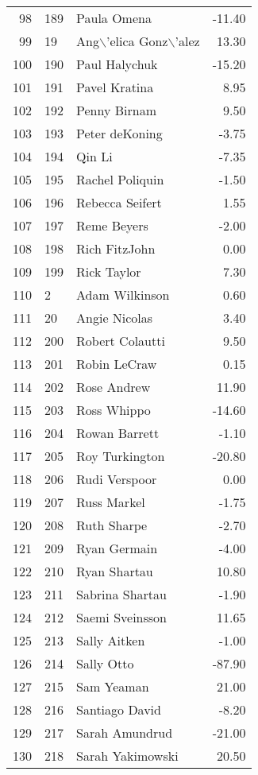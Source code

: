 \begin{table}[ht]
\begin{tabular}{rllr}
  98 & 189 & Paula Omena & -11.40 \\ 
  99 & 19 & Ang$\backslash$'elica Gonz$\backslash$'alez & 13.30 \\ 
  100 & 190 & Paul Halychuk & -15.20 \\ 
  101 & 191 & Pavel Kratina & 8.95 \\ 
  102 & 192 & Penny Birnam & 9.50 \\ 
  103 & 193 & Peter deKoning & -3.75 \\ 
  104 & 194 & Qin Li & -7.35 \\ 
  105 & 195 & Rachel Poliquin & -1.50 \\ 
  106 & 196 & Rebecca Seifert & 1.55 \\ 
  107 & 197 & Reme Beyers & -2.00 \\ 
  108 & 198 & Rich FitzJohn & 0.00 \\ 
  109 & 199 & Rick Taylor & 7.30 \\ 
  110 & 2 & Adam Wilkinson & 0.60 \\ 
  111 & 20 & Angie Nicolas & 3.40 \\ 
  112 & 200 & Robert Colautti & 9.50 \\ 
  113 & 201 & Robin LeCraw & 0.15 \\ 
  114 & 202 & Rose Andrew & 11.90 \\ 
  115 & 203 & Ross Whippo & -14.60 \\ 
  116 & 204 & Rowan Barrett & -1.10 \\ 
  117 & 205 & Roy Turkington & -20.80 \\ 
  118 & 206 & Rudi Verspoor & 0.00 \\ 
  119 & 207 & Russ Markel & -1.75 \\ 
  120 & 208 & Ruth Sharpe & -2.70 \\ 
  121 & 209 & Ryan Germain & -4.00 \\ 
  122 & 210 & Ryan Shartau & 10.80 \\ 
  123 & 211 & Sabrina Shartau & -1.90 \\ 
  124 & 212 & Saemi Sveinsson & 11.65 \\ 
  125 & 213 & Sally Aitken & -1.00 \\ 
  126 & 214 & Sally Otto & -87.90 \\ 
  127 & 215 & Sam Yeaman & 21.00 \\ 
  128 & 216 & Santiago David & -8.20 \\ 
  129 & 217 & Sarah Amundrud & -21.00 \\ 
  130 & 218 & Sarah Yakimowski & 20.50 \\ 

\end{tabular}
\end{table}

